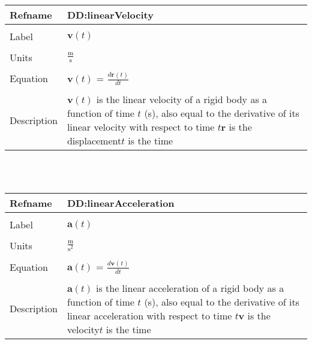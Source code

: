 \documentclass[12pt]{article}
\begin{document}
~\newline
\noindent \begin{minipage}{\textwidth}
\begin{tabular}{p{} p{}}
\toprule \textbf{Refname} & \textbf{DD:linearVelocity}
\label{DD:linearVelocity}
\\ \midrule \\
Label & $\mathbf{v}(t)$
\\ \midrule \\
Units & $\frac{\text{m}}{\text{s}}$
\\ \midrule \\
Equation & $\mathbf{v}(t)$ = $\frac{d\mathbf{r}(t)}{dt}$
\\ \midrule \\
Description & $\mathbf{v}(t)$ is the linear velocity of a rigid body as a function of time $t$ (s), also equal to the derivative of its linear velocity with respect to time $t$\newline$\mathbf{r}$ is the displacement\newline$t$ is the time
\\ \bottomrule \end{tabular}
\end{minipage}\\
~\newline
\noindent \begin{minipage}{\textwidth}
\begin{tabular}{p{} p{}}
\toprule \textbf{Refname} & \textbf{DD:linearAcceleration}
\label{DD:linearAcceleration}
\\ \midrule \\
Label & $\mathbf{a}(t)$
\\ \midrule \\
Units & $\frac{\text{m}}{\text{s}^{2}}$
\\ \midrule \\
Equation & $\mathbf{a}(t)$ = $\frac{d\mathbf{v}(t)}{dt}$
\\ \midrule \\
Description & $\mathbf{a}(t)$ is the linear acceleration of a rigid body as a function of time $t$ (s), also equal to the derivative of its linear acceleration with respect to time $t$\newline$\mathbf{v}$ is the velocity\newline$t$ is the time
\\ \bottomrule \end{tabular}
\end{minipage}\\
\end{document}
